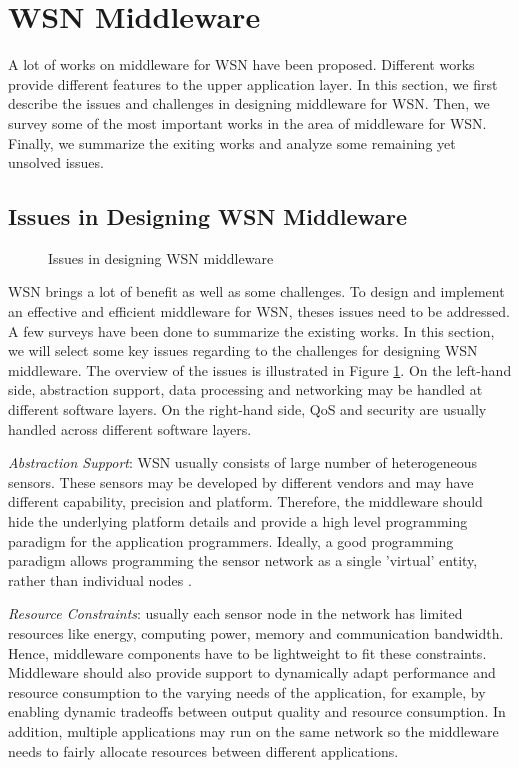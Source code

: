 \section{WSN Middleware}
\label{subsec:wsn-middleware}
A lot of works on middleware for WSN have been proposed. Different works provide different features to the upper application layer. In this section, we first describe the issues and challenges in designing middleware for WSN. Then, we survey some of the most important works in the area of middleware for WSN. Finally, we summarize the exiting works and analyze some remaining yet unsolved issues.

\subsection{Issues in Designing WSN Middleware}
\label{sec:middleware-issues}
\begin{figure}
\centering
{}
\caption{Issues in designing WSN middleware}
\label{fig:wsn-middleware-issues}
\end{figure}

WSN brings a lot of benefit as well as some challenges. To design and implement an effective and efficient middleware for WSN, theses issues need to be addressed. A few surveys \cite{programmingparadigms, middlewaresurvey1, middlewaresurvey2, middlewarechallenge} have been done to summarize the existing works. In this section, we will select some key issues regarding to the challenges for designing WSN middleware. The overview of the issues is illustrated in Figure \ref{fig:wsn-middleware-issues}. On the left-hand side, abstraction support, data processing and networking may be handled at different software layers. On the right-hand side, QoS and security are usually handled across different software layers.

\emph{Abstraction Support}: WSN usually consists of large number of heterogeneous sensors. These sensors may be developed by different vendors and may have different capability, precision and platform. Therefore, the middleware should hide the underlying platform details and provide a high level programming paradigm for the application programmers. Ideally, a good programming paradigm allows programming the sensor network as a single 'virtual' entity, rather than individual nodes \cite{programmingparadigms}.

\emph{Resource Constraints}: usually each sensor node in the network has limited resources like energy, computing power, memory and communication bandwidth. Hence, middleware components have to be lightweight to fit these constraints. Middleware should also provide support to dynamically adapt performance and resource consumption to the varying needs of the application, for example, by enabling dynamic tradeoffs between output quality and resource consumption. In addition, multiple applications may run on the same network so the middleware needs to fairly allocate resources between different applications.

